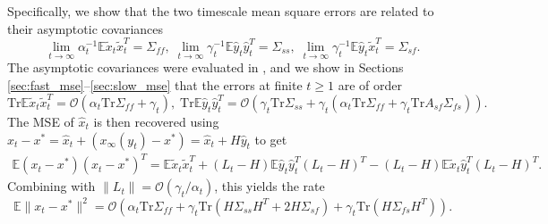 Specifically, we show that the two timescale mean square errors are related to their asymptotic covariances
\begin{equation}
    \lim_{t \to \infty} \alpha_t^{-1} \mathbb{E} \tilde{x}_t \tilde{x}_t^T = \Sigma_{ff} , \; 
    \lim_{t \to \infty} \gamma_t^{-1} \mathbb{E} \hat{y}_t \hat{y}_t^T = \Sigma_{ss} , 
    \; 
     \lim_{t \to \infty} \gamma_t^{-1} \mathbb{E} \hat{y}_t \tilde{x}_t^T = \Sigma_{sf} .
\end{equation}
The asymptotic covariances were evaluated in \citep{konda2004convergence}, and we show in Sections \ref{sec:fast_mse}--\ref{sec:slow_mse} that the errors at finite $t \geq 1$ are of order
\begin{equation}
    \mathrm{Tr}\mathbb{E}\tilde{x}_t \tilde{x}_t^T = \mathcal{O}\left(\alpha_t \mathrm{Tr} \Sigma_{ff} + \gamma_t\right), 
    \;
    \mathrm{Tr} \mathbb{E}\hat{y}_t \hat{y}_t^T = \mathcal{O}\left(\gamma_t \mathrm{Tr} \Sigma_{ss} + \gamma_t \left(\alpha_t \mathrm{Tr} \Sigma_{ff} + \gamma_t \mathrm{Tr} A_{sf} \Sigma_{fs}\right) \right) .
\end{equation}
The MSE of $\hat{x}_t$ is then recovered using $x_t - x^* = \hat{x}_t + (x_\infty (y_t) - x^*) = \hat{x}_t + H \hat{y}_t$ to get
\begin{align*}
    \mathbb{E}\left(x_t - x^*\right) \left(x_t - x^* \right)^T 
    = \mathbb{E} \tilde{x}_t \tilde{x}_t^T
    + (L_t - H) \mathbb{E} \hat{y}_t \hat{y}_t^T (L_t - H)^T
    - (L_t - H) \mathbb{E} \tilde{x}_t \hat{y}_t^T (L_t - H)^T .    
\end{align*}
Combining with $\lVert L_t \rVert = \mathcal{O}(\gamma_t/\alpha_t)$, this yields the rate
\begin{equation}
    \mathbb{E} \lVert x_t - x^*\rVert^2 = \mathcal{O}\left(\alpha_t \mathrm{Tr} \Sigma_{ff} 
    + \gamma_t \mathrm{Tr} (H \Sigma_{ss} H^T + 2 H \Sigma_{sf})
    + \gamma_t \mathrm{Tr} (H \Sigma_{fs} H^T) \right).
\end{equation}
